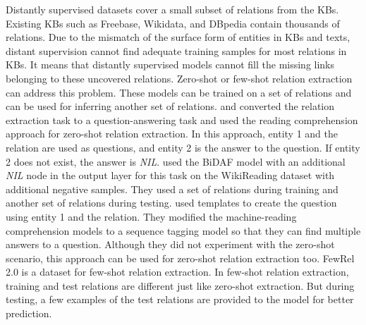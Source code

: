 Distantly supervised datasets cover a small subset of relations from the KBs. Existing KBs such as Freebase, Wikidata, and DBpedia contain thousands of relations. Due to the mismatch of the surface form of entities in KBs and texts, distant supervision cannot find adequate training samples for most relations in KBs. It means that distantly supervised models cannot fill the missing links belonging to these uncovered relations. Zero-shot or few-shot relation extraction can address this problem. These models can be trained on a set of relations and can be used for inferring another set of relations. 
 and  converted the relation extraction task to a question-answering task and used the reading comprehension approach for zero-shot relation extraction. In this approach, entity 1 and the relation are used as questions, and entity 2 is the answer to the question. If entity 2 does not exist, the answer is {\em NIL}.  used the BiDAF model  with an additional {\em NIL} node in the output layer for this task on the WikiReading  dataset with additional negative samples. They used a set of relations during training and another set of relations during testing.  used templates to create the question using entity 1 and the relation. They modified the machine-reading comprehension models to a sequence tagging model so that they can find multiple answers to a question. Although they did not experiment with the zero-shot scenario, this approach can be used for zero-shot relation extraction too. FewRel 2.0  is a dataset for few-shot relation extraction. In few-shot relation extraction, training and test relations are different just like zero-shot extraction. But during testing, a few examples of the test relations are provided to the model for better prediction.

